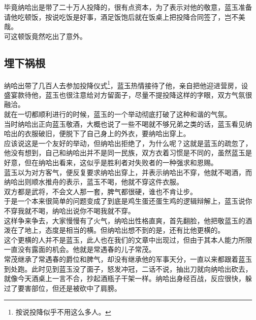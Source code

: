 \begin{multicols}{\theparacolNo}
毕竟纳哈出是带了二十万人投降的，很有点资本，为了表示对他的敬意，蓝玉准备请他吃顿饭，按说吃饭是好事，酒足饭饱后就在饭桌上把投降合同签了，岂不美哉。\\

可这顿饭竟然吃出了意外。\\

\subsection{埋下祸根}
纳哈出带了几百人去参加投降仪式\footnote{按说投降似乎不用这么多人。}，蓝玉热情接待了他，亲自把他迎进营房，设盛宴款待他，蓝玉也很注意给对方留面子，尽量不提投降这样的字眼，双方气氛很融洽。\\

就在一切都顺利进行的时候，蓝玉的一个举动彻底打破了这种和谐的气氛。\\

当时纳哈出正向蓝玉敬酒，大概也说了一些不喝就不够兄弟之类的话，蓝玉看见纳哈出的衣服破旧，便脱下了自己身上的外衣，要纳哈出穿上。\\

应该说这是一个友好的举动，但纳哈出拒绝了，为什么呢？这就是蓝玉的疏忽了，他没有想到，自己和纳哈出并不是同一民族，双方衣着习惯是不同的，虽然蓝玉是好意，但在纳哈出看来，这似乎是胜利者对失败者的一种强求和恩赐。\\

蓝玉以为对方客气，便反复要求纳哈出穿上，并表示纳哈出不穿，他就不喝酒，而纳哈出则顺水推舟的表示，蓝玉不喝，他就不穿这件衣服。\\

双方都是武将，不会文人那一套，脾气都很硬，谁也不肯让步。\\

于是一个本来很简单的问题变成了到底是鸡生蛋还蛋生鸡的逻辑辩解上，蓝玉说你不穿我就不喝，纳哈出说你不喝我就不穿。\\

这样争来争去，大家慢慢有了火气，纳哈出性格直爽，首先翻脸，他把敬蓝玉的酒泼在了地上，态度是相当的横。但纳哈出想不到的是，还有比他更横的。\\

这个更横的人并不是蓝玉，此人也在我们的文章中出现过，但由于其本人能力所限一直没有露面的机会。他就是常遇春的儿子常茂。\\

常茂继承了常遇春的爵位和脾气，却没有继承他的军事天分，一直以来都跟着蓝玉到处跑。此时见到蓝玉没了面子，怒发冲冠，二话不说，抽出刀就向纳哈出砍去，就像今天酒桌上一言不合，抄起酒瓶子干架一样。纳哈出身经百战，反应很快，躲过了要害部位，但还是被砍中了肩膀。\\


\end{multicols}
